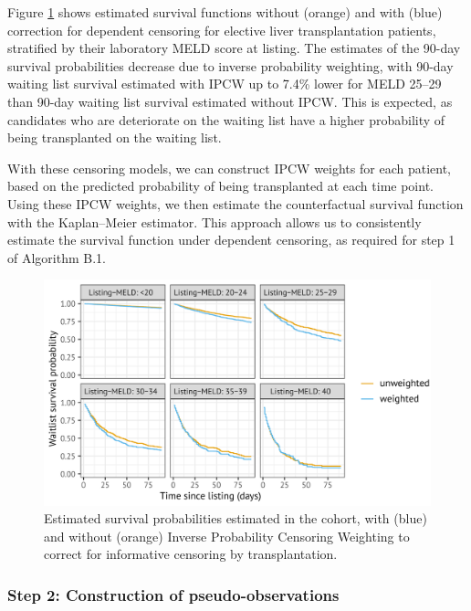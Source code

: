\documentclass[11pt,twoside,]{book}
\begin{document}
Figure \ref{fig:chappsfig2} shows estimated survival functions
without (orange) and with (blue) correction for dependent censoring for
elective liver transplantation patients, stratified by their laboratory MELD score at listing. The estimates of the 90-day survival probabilities decrease
due to
inverse probability weighting, with 90-day waiting list survival
estimated with IPCW up to 7.4\% lower for MELD 25--29 than 90-day waiting
list survival estimated without IPCW. This is expected, as candidates who
are deteriorate on the waiting list have a higher probability of being
transplanted on the waiting list.

With these censoring models, we can construct IPCW weights for each patient, based on the predicted probability
of being transplanted at each time point. Using these IPCW weights, we then
estimate the counterfactual survival function with the Kaplan--Meier estimator.
This approach allows us to consistently estimate the survival function under
dependent censoring, as required for step 1 of Algorithm B.1.

\begin{figure}[ht]

{\centering \includegraphics[width=0.9\linewidth]{figures/appendix//sfig2-estimated_event_probs} 

}

\caption{Estimated survival probabilities estimated in the cohort, with (blue) and without (orange) Inverse Probability Censoring Weighting to correct for informative censoring by transplantation.}\label{fig:chappsfig2}
\end{figure}

\newpage

\subsubsection*{Step 2: Construction of pseudo-observations}\label{step-2-construction-of-pseudo-observations}
\end{document}
